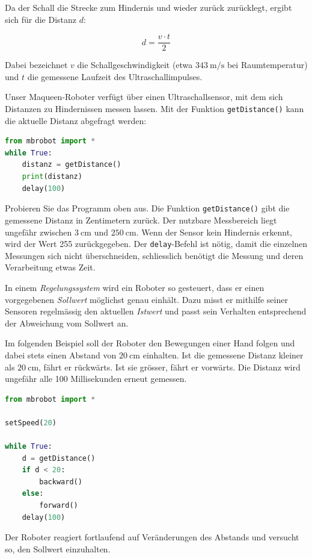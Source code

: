 Da der Schall die Strecke zum Hindernis und wieder zurück
zurücklegt, ergibt sich für die Distanz \(d\):

\[
    d = \frac{v \cdot t}{2}
\]

Dabei bezeichnet \(v\) die Schallgeschwindigkeit
(etwa \(\SI{343}{\meter\per\second}\) bei Raumtemperatur)
und \(t\) die gemessene Laufzeit des Ultraschallimpulses.

Unser Maqueen-Roboter verfügt über einen Ultraschallsensor,
mit dem sich Distanzen zu Hindernissen messen lassen.
Mit der Funktion \texttt{getDistance()} kann die aktuelle
Distanz abgefragt werden:

\begin{lstlisting}[language=Python]
from mbrobot import *
while True:
    distanz = getDistance()
    print(distanz)
    delay(100)
\end{lstlisting}

Probieren Sie das Programm oben aus.
Die Funktion \texttt{getDistance()} gibt die gemessene
Distanz in Zentimetern zurück. Der nutzbare Messbereich
liegt ungefähr zwischen \(\SI{3}{\centi\meter}\) und
\(\SI{250}{\centi\meter}\). Wenn der Sensor kein Hindernis erkennt, wird der Wert 255 zurückgegeben. Der \texttt{delay}-Befehl ist nötig, damit die einzelnen Messungen sich nicht überschneiden, schliesslich benötigt die Messung und deren Verarbeitung etwas Zeit.



\begin{myexample}


    In einem \emph{Regelungssystem} wird ein Roboter so gesteuert,
    dass er einen vorgegebenen \emph{Sollwert} möglichst genau
    einhält. Dazu misst er mithilfe seiner Sensoren regelmässig
    den aktuellen \emph{Istwert} und passt sein Verhalten
    entsprechend der Abweichung vom Sollwert an.

    Im folgenden Beispiel soll der Roboter den Bewegungen
    einer Hand folgen und dabei stets einen Abstand von
    \(\SI{20}{\centi\meter}\) einhalten. Ist die gemessene
    Distanz kleiner als \(\SI{20}{\centi\meter}\), fährt er
    rückwärts. Ist sie grösser, fährt er vorwärts.
    Die Distanz wird ungefähr alle 100 Millisekunden
    erneut gemessen.

    \begin{lstlisting}[language=Python]
from mbrobot import *

setSpeed(20)

while True:
    d = getDistance()
    if d < 20:
        backward()
    else:
        forward()
    delay(100)
    \end{lstlisting}

    Der Roboter reagiert fortlaufend auf Veränderungen
    des Abstands und versucht so, den Sollwert einzuhalten.
\end{myexample}



